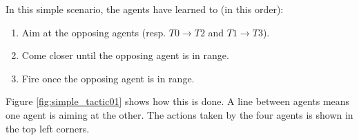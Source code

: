 In this simple scenario, the agents have learned to (in this order):
\begin{enumerate}
    \item Aim at the opposing agents (resp. $T0 \rightarrow T2$ and $T1 \rightarrow T3$).
    \item Come closer until the opposing agent is in range.
    \item Fire once the opposing agent is in range.
\end{enumerate}
Figure \ref{fig:simple_tactic01} shows how this is done. A line between agents means one agent is aiming at the other. The actions taken by the four agents is shown in the top left corners.



